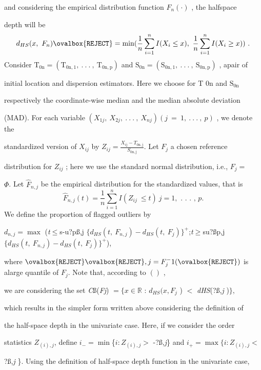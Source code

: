 \documentclass[a4paper,12pt]{article}
\begin{document}
and considering the empirical distribution function $F_{n}(\cdot)$ , the halfspace

depth will be
$$
d_{HS}(x,\ F_{n})\ovalbox{\tt\small REJECT}=\min(\frac{1}{n}\sum_{i=1}^{n}I(X_{i}\leq x),\ \frac{1}{n}\sum_{i=1}^{n}I(X_{i}\geq x))\ .
$$
Consider $\mathrm{T}_{0\mathrm{n}} = (\mathrm{T}_{0\mathrm{n},1},\ .\ .\ .\ ,\ \mathrm{T}_{0\mathrm{n},\mathrm{p}})$ and $\mathrm{S}_{0\mathrm{n}} = (\mathrm{S}_{0\mathrm{n},1},\ .\ .\ .\ ,\ \mathrm{S}_{0\mathrm{n},\mathrm{p}})$ , apair of

initial location and dispersion estimators. Here we choose for T $0\mathrm{n}$ and $\mathrm{S}_{0\mathrm{n}}$

respectively the coordinate-wise median and the median absolute deviation

(MAD). For each variable $(X_{1j},\ X_{2j},\ .\ .\ .\ ,\ X_{nj}) (j\ =\ 1,\ .\ .\ .\ ,\ p)$ , we denote the

standardized version of $X_{ij}$ by $Z_{ij} = \displaystyle \frac{X_{i\mathrm{j}}-T_{0\mathrm{n},\mathrm{j}}}{S_{0\mathrm{n},\mathrm{j}}}$. Let $F_{j}$ a chosen reference

distribution for $Z_{ij}$ ; here we use the standard normal distribution, i.e., $F_{j}=$

$\Phi$. Let $\hat{F}_{n,j}$ be the empirical distribution for the standardized values, that is
$$
\hat{F}_{n,j}(t)=\frac{1}{n}\sum_{i=1}^{n}I(Z_{ij}\ \leq t)\ j=1,\text{ . . . , }p.
$$
We define the proportion of flagged outliers by

$ d_{n,j}=\displaystyle \max$ ({\it t}$\leq$s-u?pß,j $\{d_{HS} (t,\ F_{n,j})-d_{HS}(t,\ F_{j})\}^{+}$;{\it t}$\geq$su?ßp,j $\{d_{HS}(t,\ F_{n,j})-d_{HS}(t,\ F_{j})\}^{+}$),

where $\ovalbox{\tt\small REJECT}\ovalbox{\tt\small REJECT},j= F_{j}^{-}1(\ovalbox{\tt\small REJECT})$ is alarge quantile of $F_{j}$. Note that, according to $()$ ,

we are considering the set {\it C}ß({\it Fj}) $= \{x \in \mathbb{R}$ : $d_{HS}(x, F_{j}$ ) $<$ {\it dHS}(?ß,{\it j} )$\},$

which results in the simpler form written above considering the definition of

the half-space depth in the univariate case. Here, if we consider the order

statistics $Z_{(i),j}$, define $ i_{-}=\displaystyle \min$\{$i:Z_{(i),j} >$ -?ß,{\it j}\} and $i_{+}=\displaystyle \max\{i:Z_{(i),j} <$

?ß,{\it j} \}. Using the definition of half-space depth function in the univariate case,
\end{document}
